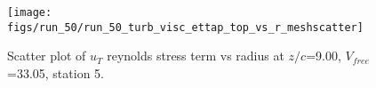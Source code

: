 \begin{figure}[H]
\centering
\texttt{[image: figs/run\_50/run\_50\_turb\_visc\_ettap\_top\_vs\_r\_meshscatter]}
\caption{Scatter plot of $
u_T$ reynolds stress term vs radius at $z/c$=9.00, $V_{free}$=33.05, station 5.}
\end{figure}


